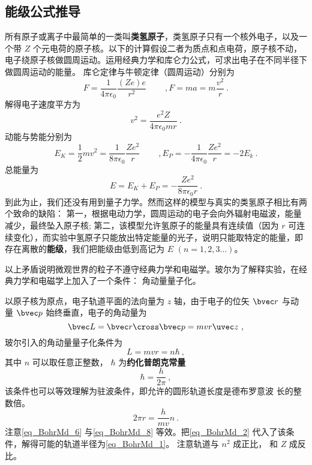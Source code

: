 \subsection{能级公式推导}
所有原子或离子中最简单的一类叫\textbf{类氢原子}，类氢原子只有一个核外电子，以及一个带 $Z$ 个元电荷的原子核。以下的计算假设二者为质点和点电荷，原子核不动，电子绕原子核做圆周运动。运用经典力学和库仑力公式，可求出电子在不同半径下做圆周运动的能量。 库仑定律与牛顿定律（圆周运动）分别为
\begin{equation}
F = \frac{1}{4\pi \epsilon_0} \frac{(Ze)e}{r^2}
\qquad~,
F = ma = m\frac{v^2}{r}~.
\end{equation}
解得电子速度平方为
\begin{equation}\label{eq_BohrMd_2}
v^2 = \frac{e^2 Z}{4\pi \epsilon_0 mr}~.
\end{equation}
动能与势能分别为
\begin{equation}
E_K = \frac12 m v^2 = \frac{1}{8\pi\epsilon_0} \frac{Z e^2}{r}
\qquad~,
E_P =  -\frac{1}{4\pi\epsilon_0} \frac{Ze^2}{r} = -2 E_k~.
\end{equation}   
总能量为
\begin{equation}\label{eq_BohrMd_4}
E = E_K + E_P =  -\frac{Z e^2}{8\pi\epsilon_0 r}~.
\end{equation}
到此为止，我们还没有用到量子力学。然而这样的模型与真实的类氢原子相比有两个致命的缺陷： 第一，根据电动力学，圆周运动的电子会向外辐射电磁波，能量减少，最终坠入原子核; 第二，该模型允许氢原子的能量具有连续值（因为 $r$ 可连续变化），而实验中氢原子只能放出特定能量的光子，说明只能取特定的能量，即存在离散的\textbf{能级}，我们把能级由低到高记为 $E$  $(n = 1,2,3\dots)$。 

以上矛盾说明微观世界的粒子不遵守经典力学和电磁学。玻尔为了解释实验，在经典力学和电磁学上加入了一个条件： 角动量量子化。

以原子核为原点，电子轨道平面的法向量为 $z$ 轴，由于电子的位矢 $\bvec r$ 与动量 $\bvec p$ 始终垂直，电子的角动量为
\begin{equation}
\bvec L = \bvec r \cross \bvec p = mvr \uvec z~,
\end{equation}
玻尔引入的角动量量子化条件为
\begin{equation}\label{eq_BohrMd_6}
L = mvr = n\hbar~,
\end{equation}
其中 $n$ 可以取任意正整数， $\hbar$ 为\textbf{约化普朗克常量}
\begin{equation}\label{eq_BohrMd_7}
\hbar  = \frac{h}{2\pi}~,
\end{equation}
该条件也可以等效理解为驻波条件，即允许的圆形轨道长度是德布罗意波%
长的整数倍。
\begin{equation}\label{eq_BohrMd_8}
2\pi r  = \frac{h}{mv} n~.
\end{equation}
注意\autoref{eq_BohrMd_6} 与\autoref{eq_BohrMd_8} 等效。把\autoref{eq_BohrMd_2} 代入了该条件，解得可能的轨道半径为\autoref{eq_BohrMd_1}。 注意轨道与 $n^2$ 成正比， 和 $Z$ 成反比。

